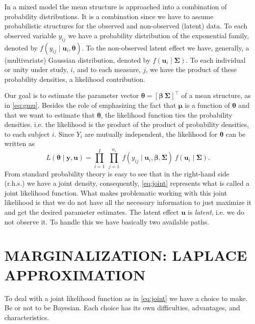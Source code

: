 In a mixed model the mean structure is approached into a combination of
probability distributions. It is a combination since we have to assume
probabilistic structures for the observed and non-observed (latent)
data. To each observed variable \(y_{ij}\) we have a probability
distribution of the exponential family, denoted by \(f(y_{ij} \mid
\mathbf{u}_{i}, \bm{\theta})\). To the non-observed latent effect we
have, generally, a (multivariate) Gaussian distribution, denoted by
\(f(\mathbf{u}_{i} \mid \bm{\Sigma})\). To each individual or unity
under study, \(i\), and to each measure, \(j\), we have the product of
these probability densities, a likelihood contribution.

Our goal is to estimate the parameter vector \(\bm{\theta} =
[\bm{\beta}~\bm{\Sigma}]^{\top}\) of a mean structure, as in
\autoref{eq:gmu}. Besides the role of emphasizing the fact that
\(\bm{\mu}\) is a function of \(\bm{\theta}\) and that we want to
estimate that \(\bm{\theta}\), the likelihood function ties the
probability densities. i.e. the likelihood is the product of the product
of probability densities, to each subject \(i\). Since \(Y_{i}\) are
mutually independent, the likelihood for \(\bm{\theta}\) can be written
as
\begin{equation}
  L(\bm{\theta} \mid \mathbf{y}, \mathbf{u}) =
  \prod_{i=1}^{I}~\prod_{j=1}^{n_{i}}~
  f(y_{ij} \mid \mathbf{u}_{i}, \bm{\beta}, \bm{\Sigma})~
  f(\mathbf{u}_{i} \mid \bm{\Sigma}).
  \label{eq:joint}
\end{equation}
From standard probability theory is easy to see that in the right-hand
side (r.h.s.) we have a joint density, consequently, \autoref{eq:joint}
represents what is called a joint likelihood function. What makes
problematic working with this joint likelihood is that we do not have
all the necessary information to just maximize it and get the desired
parameter estimates. The latent effect \(\mathbf{u}\) is
\textit{latent}, i.e. we do not observe it. To handle this we have
basically two available paths.

\section{MARGINALIZATION: LAPLACE APPROXIMATION}
\label{cap:laplace}

To deal with a joint likelihood function as in \autoref{eq:joint} we
have a choice to make. Be or not to be Bayesian. Each choice has its own
difficulties, advantages, and characteristics.

